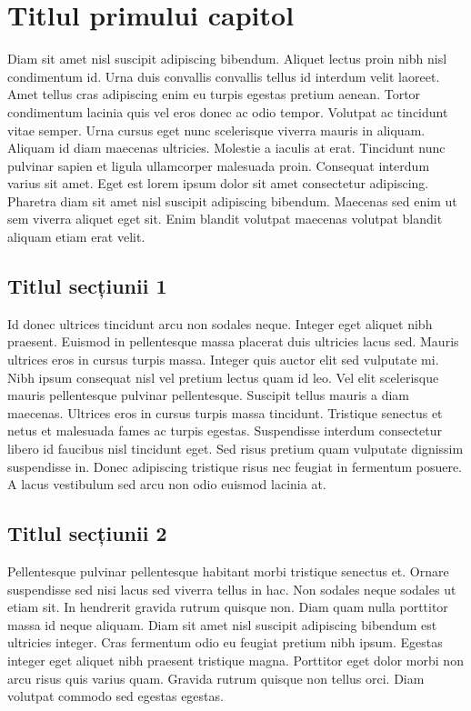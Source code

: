 \chapter{Titlul primului capitol}

Diam sit amet nisl suscipit adipiscing bibendum. Aliquet lectus proin nibh nisl condimentum id. Urna duis convallis convallis tellus 
id interdum velit laoreet. Amet tellus cras adipiscing enim eu turpis egestas pretium aenean. Tortor condimentum lacinia quis vel eros 
donec ac odio tempor. Volutpat ac tincidunt vitae semper. Urna cursus eget nunc scelerisque viverra mauris in aliquam. Aliquam id diam 
maecenas ultricies. Molestie a iaculis at erat. Tincidunt nunc pulvinar sapien et ligula ullamcorper malesuada proin. Consequat interdum 
varius sit amet. Eget est lorem ipsum dolor sit amet consectetur adipiscing. Pharetra diam sit amet nisl suscipit adipiscing bibendum. 
Maecenas sed enim ut sem viverra aliquet eget sit. Enim blandit volutpat maecenas volutpat blandit aliquam etiam erat velit.

\section{Titlul secțiunii 1}

Id donec ultrices tincidunt arcu non sodales neque. Integer eget aliquet nibh praesent. Euismod in pellentesque massa placerat duis 
ultricies lacus sed. Mauris ultrices eros in cursus turpis massa. Integer quis auctor elit sed vulputate mi. Nibh ipsum consequat nisl 
vel pretium lectus quam id leo. Vel elit scelerisque mauris pellentesque pulvinar pellentesque. Suscipit tellus mauris a diam maecenas. 
Ultrices eros in cursus turpis massa tincidunt. Tristique senectus et netus et malesuada fames ac turpis egestas. Suspendisse interdum 
consectetur libero id faucibus nisl tincidunt eget. Sed risus pretium quam vulputate dignissim suspendisse in. Donec adipiscing tristique 
risus nec feugiat in fermentum posuere. A lacus vestibulum sed arcu non odio euismod lacinia at.

\section{Titlul secțiunii 2}

Pellentesque pulvinar pellentesque habitant morbi tristique senectus et. Ornare suspendisse sed nisi lacus sed viverra tellus in hac. 
Non sodales neque sodales ut etiam sit. In hendrerit gravida rutrum quisque non. Diam quam nulla porttitor massa id neque aliquam. Diam 
sit amet nisl suscipit adipiscing bibendum est ultricies integer. Cras fermentum odio eu feugiat pretium nibh ipsum. Egestas integer eget 
aliquet nibh praesent tristique magna. Porttitor eget dolor morbi non arcu risus quis varius quam. Gravida rutrum quisque non tellus orci. 
Diam volutpat commodo sed egestas egestas.